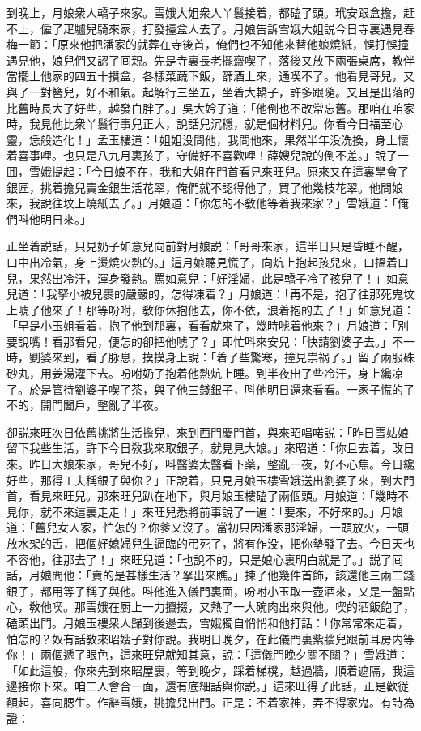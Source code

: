 到晚上，月娘衆人轎子來家。雪娥大姐衆人丫鬟接着，都磕了頭。玳安跟盒擔，赶不上，僱了疋驢兒騎來家，打發擡盒人去了。月娘告訴雪娥大姐説今日寺裏遇見春梅一節：「原來他把潘家的就葬在寺後首，俺們也不知他來替他娘燒紙，悞打悞撞遇見他，娘兒們又認了囘親。先是寺裏長老擺齋喫了，落後又放下兩張桌席，教伴當擺上他家的四五十攢盒，各樣菜蔬下飯，篩酒上來，通喫不了。他看見哥兒，又與了一對簪兒，好不和氣。起解行三坐五，坐着大轎子，許多跟隨。又且是出落的比舊時長大了好些，越發白胖了。」吳大妗子道：「他倒也不改常忘舊。那咱在咱家時，我見他比衆丫鬟行事兒正大，說話兒沉穩，就是個材料兒。你看今日福至心靈，恁般造化！」孟玉樓道：「姐姐没問他，我問他來，果然半年没洗換，身上懷着喜事哩。也只是八九月裏孩子，守備好不喜歡哩！薛嫂兒說的倒不差。」說了一囬，雪娥提起：「今日娘不在，我和大姐在門首看見來旺兒。原來又在這裏學會了銀匠，挑着擔兒賣金銀生活花翠，俺們就不認得他了，買了他幾枝花翠。他問娘來，我說往坟上燒紙去了。」月娘道：「你怎的不敎他等着我來家？」雪娥道：「俺們呌他明日來。」

正坐着説話，只見奶子如意兒向前對月娘説：「哥哥來家，這半日只是昏睡不醒，口中出冷氣，身上燙燒火熱的。」這月娘聽見慌了，向炕上抱起孩兒來，口搵着口兒，果然出冷汗，渾身發熱。罵如意兒：「好淫婦，此是轎子冷了孩兒了！」如意兒道：「我拏小被兒裹的嚴嚴的，怎得凍着？」月娘道：「再不是，抱了往那死鬼坟上唬了他來了！那等吩咐，敎你休抱他去，你不依，浪着抱的去了！」如意兒道：「早是小玉姐看着，抱了他到那裏，看看就來了，幾時唬着他來？」月娘道：「別要說嘴！看那看兒，便怎的卻把他唬了？」即忙呌來安兒：「快請劉婆子去。」不一時，劉婆來到，看了脉息，摸摸身上說：「着了些驚寒，撞見祟祸了。」留了兩服硃砂丸，用姜湯灌下去。吩咐奶子抱着他熱炕上睡。到半夜出了些冷汗，身上纔凉了。於是管待劉婆子喫了茶，與了他三錢銀子，呌他明日還來看看。一家子慌的了不的，開門闔戶，整亂了半夜。

卻説來旺次日依舊挑將生活擔兒，來到西門慶門首，與來昭唱喏説：「昨日雪姑娘留下我些生活，許下今日敎我來取銀子，就見見大娘。」來昭道：「你且去着，改日來。昨日大娘來家，哥兒不好，呌醫婆太醫看下薬，整亂一夜，好不心焦。今日纔好些，那得工夫稱銀子與你？」正說着，只見月娘玉樓雪娥送出劉婆子來，到大門首，看見來旺兒。那來旺兒趴在地下，與月娘玉樓磕了兩個頭。月娘道：「幾時不見你，就不來這裏走走！」來旺兒悉將前事說了一遍：「要來，不好來的。」月娘道：「舊兒女人家，怕怎的？你爹又沒了。當初只因潘家那淫婦，一頭放火，一頭放水架的舌，把個好媳婦兒生逼臨的弔死了，將有作没，把你墊發了去。今日天也不容他，往那去了！」來旺兒道：「也說不的，只是娘心裏明白就是了。」説了囘話，月娘問他：「賣的是甚樣生活？拏出來瞧。」揀了他幾件首飾，該還他三兩二錢銀子，都用等子稱了與他。呌他進入儀門裏面，吩咐小玉取一壺酒來，又是一盤點心，敎他喫。那雪娥在厨上一力攛掇，又熱了一大碗肉出來與他。喫的酒飯飽了，磕頭出門。月娘玉樓衆人歸到後邊去，雪娥獨自悄悄和他打話：「你常常來走着，怕怎的？奴有話敎來昭嫂子對你說。我明日晚夕，在此儀門裏紫牆兒跟前耳房内等你！」兩個遞了眼色，這來旺兒就知其意，說：「這儀門晚夕關不關？」雪娥道：「如此這般，你來先到來昭屋裏，等到晚夕，踩着梯櫈，越過牆，順着遮隔，我這邊接你下來。咱二人會合一面，還有底細話與你説。」這來旺得了此話，正是歡従額起，喜向腮生。作辭雪娥，挑擔兒出門。正是：不着家神，弄不得家鬼。有詩為證：

